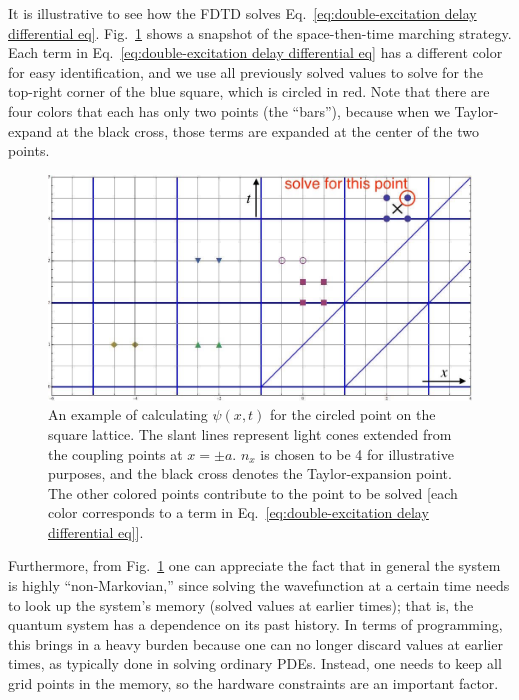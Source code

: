 \documentclass[12pt,letter,onecolumn,notitlepage]{article}
\begin{document}
It is illustrative to see how the FDTD solves Eq.~\eqref{eq:double-excitation delay differential eq}. Fig.~\ref{fig:FDTD_grid} shows a snapshot of the space-then-time marching strategy. Each term in Eq.~\eqref{eq:double-excitation delay differential eq} has a different color for easy identification, and we use all previously solved values to solve for the top-right corner of the blue square, which is circled in red. Note that there are four colors that each has only two points (the ``bars''), because when we Taylor-expand at the black cross, those terms are expanded at the center of the two points. 

\begin{figure}[htb]
	\centering
	\includegraphics[scale=0.4]{FDTD_grid}
	\caption{An example of calculating $\psi(x,t)$ for the circled point on the square lattice. The slant lines represent light cones extended from the coupling points at $x=\pm a$. $n_x$ is chosen to be 4 for illustrative purposes, and the black cross denotes the Taylor-expansion point. The other colored points contribute to the point to be solved [each color corresponds to a term in Eq.~\eqref{eq:double-excitation delay differential eq}].}
	\label{fig:FDTD_grid}
\end{figure}

Furthermore, from Fig.~\ref{fig:FDTD_grid} one can appreciate the fact that in general the system is highly ``non-Markovian,'' since solving the wavefunction at a certain time needs to look up the system's memory (solved values at earlier times); that is, the quantum system has a dependence on its past history. In terms of programming, this brings in a heavy burden because one can no longer discard values at earlier times, as typically done in solving ordinary PDEs. Instead, one needs to keep all grid points in the memory, so the hardware constraints are an important factor. 
\end{document}

